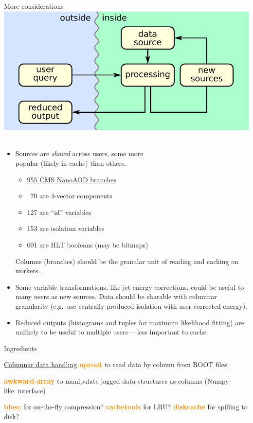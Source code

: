 \documentclass[aspectratio=169]{beamer}
\begin{document}
\begin{frame}{More considerations}
\vspace{0.25 cm}
\hfill \mbox{\includegraphics[height=3 cm]{basic-block-diagram.pdf} \hspace{-0.75 cm}}

\vspace{-3 cm}
\begin{itemize}\setlength{\itemsep}{0.5 cm}
\item<1-> Sources are {\it shared} across users, some more \\ popular (likely in cache) than others.

\vspace{0.1 cm}
\begin{itemize}
\item \underline{955 CMS NanoAOD branches}
\item \textcolor{white}{0}70 are 4-vector components
\item 127 are ``id'' variables
\item 153 are isolation variables
\item 601 are HLT booleans (may be bitmaps)
\end{itemize}

\vspace{0.1 cm}
\hspace{-0.5 cm}Columns (branches) should be the granular unit of reading and caching on workers.

\item<2-> Some variable transformations, like jet energy corrections, could be useful to many users as new sources. Data should be sharable with columnar granularity (e.g.\ use centrally produced isolation with user-corrected energy).

\item<3-> Reduced outputs (histograms and tuples for maximum likelihood fitting) are unlikely to be useful to multiple users--- less important to cache.
\end{itemize}
\end{frame}

\begin{frame}{Ingredients}
\begin{block}{\underline{Columnar data handling}}
\textcolor{darkorange}{\bf uproot} to read data by column from ROOT files

\textcolor{darkorange}{\bf awkward-array} to manipulate jagged data structures as columns \mbox{(Numpy-like interface)\hspace{-1 cm}}

\textcolor{darkorange}{\bf blosc} for on-the-fly compression? \textcolor{darkorange}{\bf cachetools} for LRU? \textcolor{darkorange}{\bf diskcache} for spilling to disk?
\end{block}





\end{frame}
\end{document}
